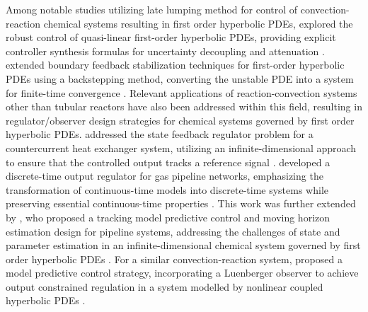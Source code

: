 Among notable studies utilizing late lumping method for control of convection-reaction chemical systems resulting in first order hyperbolic PDEs,  explored the robust control of quasi-linear first-order hyperbolic PDEs, providing explicit controller synthesis formulas for uncertainty decoupling and attenuation \autocite{christofides1998robust}.  extended boundary feedback stabilization techniques for first-order hyperbolic PDEs using a backstepping method, converting the unstable PDE into a system for finite-time convergence \autocite{krstic2008backstepping}. Relevant applications of reaction-convection systems other than tubular reactors have also been addressed within this field, resulting in regulator/observer design strategies for chemical systems governed by first order hyperbolic PDEs.  addressed the state feedback regulator problem for a countercurrent heat exchanger system, utilizing an infinite-dimensional approach to ensure that the controlled output tracks a reference signal \autocite{xu2016state}.  developed a discrete-time output regulator for gas pipeline networks, emphasizing the transformation of continuous-time models into discrete-time systems while preserving essential continuous-time properties \autocite{xie2021discrete}. This work was further extended by , who proposed a tracking model predictive control and moving horizon estimation design for pipeline systems, addressing the challenges of state and parameter estimation in an infinite-dimensional chemical system governed by first order hyperbolic PDEs \autocite{zhang2023tracking}. For a similar convection-reaction system,  proposed a model predictive control strategy, incorporating a Luenberger observer to achieve output constrained regulation in a system modelled by nonlinear coupled hyperbolic PDEs \autocite{zhang2022dynamic}. 

